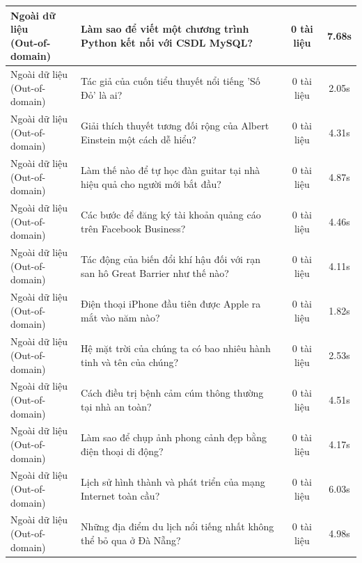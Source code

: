 \begin{longtable}{|l|p{6.5cm}|c|c|}
\makecell[l]{Ngoài dữ liệu\\(Out-of-domain)} & Làm sao để viết một chương trình Python kết nối với CSDL MySQL? & 0 tài liệu & 7.68s \\ \hline
\makecell[l]{Ngoài dữ liệu\\(Out-of-domain)} & Tác giả của cuốn tiểu thuyết nổi tiếng 'Số Đỏ' là ai? & 0 tài liệu & 2.05s \\ \hline
\makecell[l]{Ngoài dữ liệu\\(Out-of-domain)} & Giải thích thuyết tương đối rộng của Albert Einstein một cách dễ hiểu? & 0 tài liệu & 4.31s \\ \hline
\makecell[l]{Ngoài dữ liệu\\(Out-of-domain)} & Làm thế nào để tự học đàn guitar tại nhà hiệu quả cho người mới bắt đầu? & 0 tài liệu & 4.87s \\ \hline
\makecell[l]{Ngoài dữ liệu\\(Out-of-domain)} & Các bước để đăng ký tài khoản quảng cáo trên Facebook Business? & 0 tài liệu & 4.46s \\ \hline
\makecell[l]{Ngoài dữ liệu\\(Out-of-domain)} & Tác động của biến đổi khí hậu đối với rạn san hô Great Barrier như thế nào? & 0 tài liệu & 4.11s \\ \hline
\makecell[l]{Ngoài dữ liệu\\(Out-of-domain)} & Điện thoại iPhone đầu tiên được Apple ra mắt vào năm nào? & 0 tài liệu & 1.82s \\ \hline
\makecell[l]{Ngoài dữ liệu\\(Out-of-domain)} & Hệ mặt trời của chúng ta có bao nhiêu hành tinh và tên của chúng? & 0 tài liệu & 2.53s \\ \hline
\makecell[l]{Ngoài dữ liệu\\(Out-of-domain)} & Cách điều trị bệnh cảm cúm thông thường tại nhà an toàn? & 0 tài liệu & 4.51s \\ \hline
\makecell[l]{Ngoài dữ liệu\\(Out-of-domain)} & Làm sao để chụp ảnh phong cảnh đẹp bằng điện thoại di động? & 0 tài liệu & 4.17s \\ \hline
\makecell[l]{Ngoài dữ liệu\\(Out-of-domain)} & Lịch sử hình thành và phát triển của mạng Internet toàn cầu? & 0 tài liệu & 6.03s \\ \hline
\makecell[l]{Ngoài dữ liệu\\(Out-of-domain)} & Những địa điểm du lịch nổi tiếng nhất không thể bỏ qua ở Đà Nẵng? & 0 tài liệu & 4.98s \\ \hline

\end{longtable}
